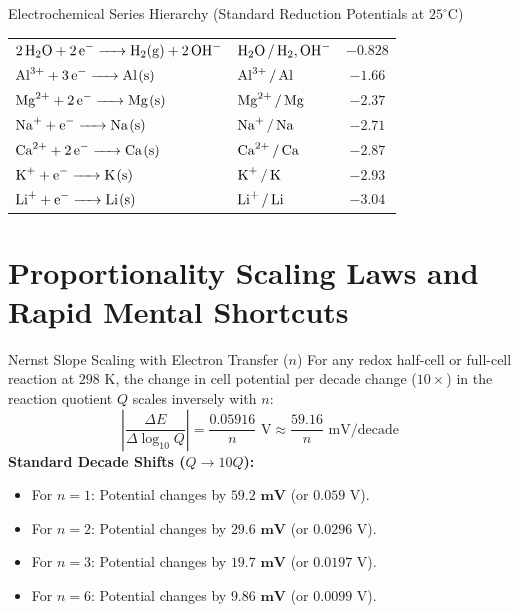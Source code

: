 \documentclass[11pt,a4paper]{report}
\begin{document}
\begin{databox}{Electrochemical Series Hierarchy (Standard Reduction Potentials at $25^\circ\text{C}$)}
\begin{tabular}{llc}
$\ce{2H2O + 2e^- -> H2(g) + 2OH^-}$ & $\ce{H2O / H2, OH^-}$ & $-0.828$ \\
$\ce{Al^{3+} + 3e^- -> Al(s)}$ & $\ce{Al^{3+} / Al}$ & $-1.66$ \\
$\ce{Mg^{2+} + 2e^- -> Mg(s)}$ & $\ce{Mg^{2+} / Mg}$ & $-2.37$ \\
$\ce{Na^+ + e^- -> Na(s)}$ & $\ce{Na^+ / Na}$ & $-2.71$ \\
$\ce{Ca^{2+} + 2e^- -> Ca(s)}$ & $\ce{Ca^{2+} / Ca}$ & $-2.87$ \\
$\ce{K^+ + e^- -> K(s)}$ & $\ce{K^+ / K}$ & $-2.93$ \\
$\ce{Li^+ + e^- -> Li(s)}$ & $\ce{Li^+ / Li}$ & $-3.04$ \\
\bottomrule
\end{tabular}
\end{databox}

\chapter{Proportionality Scaling Laws and Rapid Mental Shortcuts}

\begin{shortcutbox}{Nernst Slope Scaling with Electron Transfer ($n$)}
For any redox half-cell or full-cell reaction at $298\text{ K}$, the change in cell potential per decade change ($10\times$) in the reaction quotient $Q$ scales inversely with $n$:
\begin{equation}
\boxed{
\left|\frac{\Delta E}{\Delta \log_{10} Q}\right| = \frac{0.05916}{n}\text{ V} \approx \frac{59.16}{n}\text{ mV/decade}
}
\end{equation}
\textbf{Standard Decade Shifts ($Q \to 10 Q$):}
\begin{itemize}
    \item For $n = 1$: Potential changes by $\bm{59.2\text{ mV}}$ (or $0.059\text{ V}$).
    \item For $n = 2$: Potential changes by $\bm{29.6\text{ mV}}$ (or $0.0296\text{ V}$).
    \item For $n = 3$: Potential changes by $\bm{19.7\text{ mV}}$ (or $0.0197\text{ V}$).
    \item For $n = 6$: Potential changes by $\bm{9.86\text{ mV}}$ (or $0.0099\text{ V}$).
\end{itemize}
\end{shortcutbox}
\end{document}
